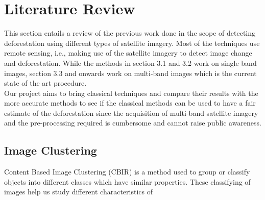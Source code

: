 \documentclass[12pt,a4paper,IEEEtran]{article}
\begin{document}

\section{Literature Review}
This section entails a review of the previous work done in the scope of detecting deforestation using different types of satellite imagery. Most of the techniques use remote sensing, i.e., making use of the satellite imagery to detect image change and deforestation. While the methods in section 3.1 and 3.2 work on single band images, section 3.3 and onwards work on multi-band images which is the current state of the art procedure. \\
Our project aims to bring classical techniques and compare their results with the more accurate methods to see if the classical methods can be used to have a fair estimate of the deforestation since the acquisition of multi-band satellite imagery and the pre-processing required is cumbersome and cannot raise public awareness.



\subsection[3.1]{Image Clustering} 
Content Based Image Clustering (CBIR) is a method used to group or classify objects into different classes which have similar properties. These classifying of images help us study different characteristics of 
\end{document}
